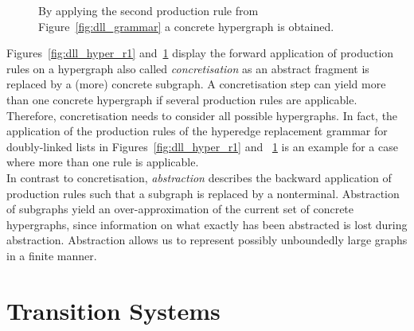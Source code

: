 \documentclass[a4paper, 12pt, twoside]{report}
\begin{document}
\begin{figure}
\begin{center}
{}
			\caption{By applying the second production rule from Figure~\ref{fig:dll_grammar} a concrete hypergraph is obtained.}\label{fig:dll_hyper_r2}
		\end{center}
	\end{figure}	
	
	Figures~\ref{fig:dll_hyper_r1} and~\ref{fig:dll_hyper_r2} display the forward application of production rules on a hypergraph also called \textit{concretisation} as an abstract fragment is replaced by a (more) concrete subgraph. A concretisation step can yield more than one concrete hypergraph if several production rules are applicable. Therefore, concretisation needs to consider all possible hypergraphs. In fact, the application of the production rules of the hyperedge replacement grammar for doubly-linked lists in Figures~\ref{fig:dll_hyper_r1} and ~\ref{fig:dll_hyper_r2} is an example for a case where more than one rule is applicable. \\
	
	In contrast to concretisation, \textit{abstraction} describes the backward application of production rules such that a subgraph is replaced by a nonterminal. Abstraction of subgraphs yield an over-approximation of the current set of concrete hypergraphs, since information on what exactly has been abstracted is lost during abstraction. Abstraction allows us to represent possibly unboundedly large graphs in a finite manner.\\
	
	\section{Transition Systems}\label{sec:transition_system}
	
\end{document}
